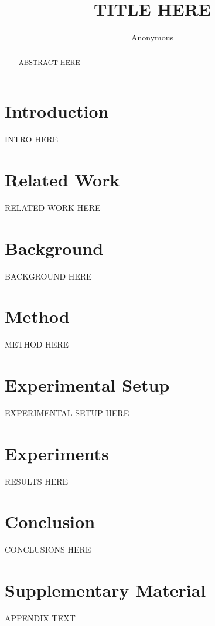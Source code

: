 \documentclass[11pt]{article}
\title{
TITLE HERE
}
\author{Anonymous}
\date{}
\begin{document}
\maketitle

\begin{abstract}
ABSTRACT HERE
\end{abstract}

\section{Introduction}
\label{sec:intro}
INTRO HERE

\section{Related Work}
\label{sec:related}
RELATED WORK HERE

\section{Background}
\label{sec:background}
BACKGROUND HERE

\section{Method}
\label{sec:method}
METHOD HERE

\section{Experimental Setup}
\label{sec:experimental_setup}
EXPERIMENTAL SETUP HERE

\section{Experiments}
\label{sec:experiments}
RESULTS HERE

\section{Conclusion}
\label{sec:conclusion}
CONCLUSIONS HERE




\appendix
\section{Supplementary Material}
APPENDIX TEXT
\end{document}
